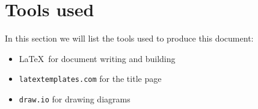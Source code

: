 \documentclass[../DD0.tex]{subfiles}
\begin{document}
\section*{Tools used}
\label{sec:tools}

  In this section we will list the tools used to produce this document:
  \begin{itemize}
    \item \LaTeX\ for document writing and building
    \item \texttt{latextemplates.com} for the title page
    \item \texttt{draw.io} for drawing diagrams
  \end{itemize}
\end{document}
